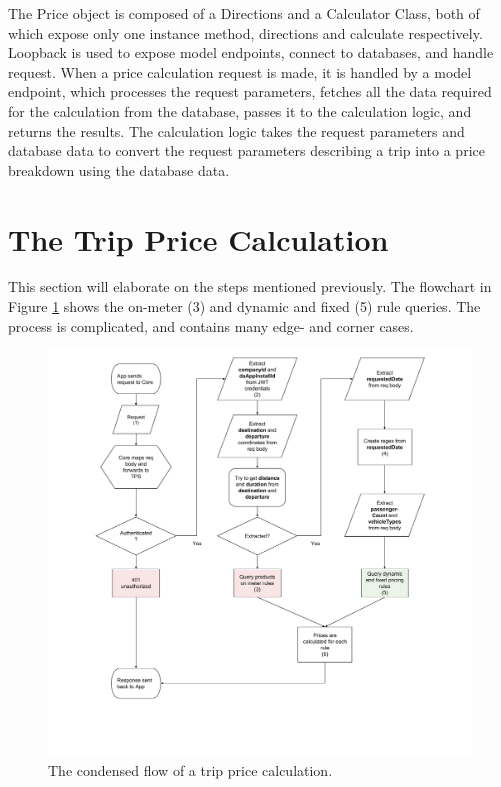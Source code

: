 The Price object is composed of a Directions and a Calculator Class, both of which expose only one instance method, directions and calculate respectively. Loopback is used to expose model endpoints, connect to databases, and handle request. When a price calculation request is made, it is handled by a model endpoint, which processes the request parameters, fetches all the data required for the calculation from the database, passes it to the calculation logic, and returns the results. The calculation logic takes the request parameters and database data to convert the request parameters describing a trip into a price breakdown using the database data.

\section{The Trip Price Calculation}
This section will elaborate on the steps mentioned previously. The flowchart in Figure \ref{fig:Calculation} shows the on-meter (3) and dynamic and fixed (5) rule queries. The process is complicated, and contains many edge- and corner cases.

\begin{figure}[H]
	\centering
	\includegraphics[width=1\textwidth]{Calculation}
	\caption[Calculation Flow]{The condensed flow of a trip price calculation.}
	\label{fig:Calculation}
\end{figure}

